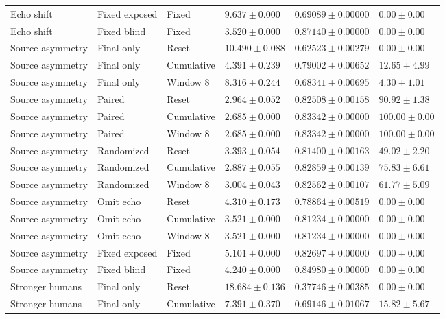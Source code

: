 \begin{longtable}{@{}llllll@{}}
Echo shift & Fixed exposed & Fixed & $9.637 \pm 0.000$ & $0.69089 \pm 0.00000$ & $0.00 \pm 0.00$ \\
Echo shift & Fixed blind & Fixed & $3.520 \pm 0.000$ & $0.87140 \pm 0.00000$ & $0.00 \pm 0.00$ \\
Source asymmetry & Final only & Reset & $10.490 \pm 0.088$ & $0.62523 \pm 0.00279$ & $0.00 \pm 0.00$ \\
Source asymmetry & Final only & Cumulative & $4.391 \pm 0.239$ & $0.79002 \pm 0.00652$ & $12.65 \pm 4.99$ \\
Source asymmetry & Final only & Window 8 & $8.316 \pm 0.244$ & $0.68341 \pm 0.00695$ & $4.30 \pm 1.01$ \\
Source asymmetry & Paired & Reset & $2.964 \pm 0.052$ & $0.82508 \pm 0.00158$ & $90.92 \pm 1.38$ \\
Source asymmetry & Paired & Cumulative & $2.685 \pm 0.000$ & $0.83342 \pm 0.00000$ & $100.00 \pm 0.00$ \\
Source asymmetry & Paired & Window 8 & $2.685 \pm 0.000$ & $0.83342 \pm 0.00000$ & $100.00 \pm 0.00$ \\
Source asymmetry & Randomized & Reset & $3.393 \pm 0.054$ & $0.81400 \pm 0.00163$ & $49.02 \pm 2.20$ \\
Source asymmetry & Randomized & Cumulative & $2.887 \pm 0.055$ & $0.82859 \pm 0.00139$ & $75.83 \pm 6.61$ \\
Source asymmetry & Randomized & Window 8 & $3.004 \pm 0.043$ & $0.82562 \pm 0.00107$ & $61.77 \pm 5.09$ \\
Source asymmetry & Omit echo & Reset & $4.310 \pm 0.173$ & $0.78864 \pm 0.00519$ & $0.00 \pm 0.00$ \\
Source asymmetry & Omit echo & Cumulative & $3.521 \pm 0.000$ & $0.81234 \pm 0.00000$ & $0.00 \pm 0.00$ \\
Source asymmetry & Omit echo & Window 8 & $3.521 \pm 0.000$ & $0.81234 \pm 0.00000$ & $0.00 \pm 0.00$ \\
Source asymmetry & Fixed exposed & Fixed & $5.101 \pm 0.000$ & $0.82697 \pm 0.00000$ & $0.00 \pm 0.00$ \\
Source asymmetry & Fixed blind & Fixed & $4.240 \pm 0.000$ & $0.84980 \pm 0.00000$ & $0.00 \pm 0.00$ \\
Stronger humans & Final only & Reset & $18.684 \pm 0.136$ & $0.37746 \pm 0.00385$ & $0.00 \pm 0.00$ \\
Stronger humans & Final only & Cumulative & $7.391 \pm 0.370$ & $0.69146 \pm 0.01067$ & $15.82 \pm 5.67$ \\

\end{longtable}
